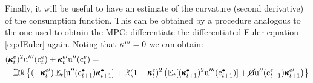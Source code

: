 \documentclass{handout}
\begin{document}
Finally, it will be useful to have an estimate of the curvature (second derivative) of the consumption function.  This can be obtained by a procedure analogous to the one used to obtain the MPC: differentiate the differentiated Euler equation \eqref{eq:dEuler} again.  Noting that $\kappa^{u\prime}=0$ we can obtain:
\begin{eqnarray}
\lefteqn{  (\MPCFunc^{e}_{t})^{2} \uPPP(\cFunc^{e}_{t}) +\MPCFunc_{t}^{e\prime}\uPP(\cFunc^{e}_{t}) = } &  & \nonumber \\ 
& & \beth \Rnorm \left\{(-\MPCFunc_{t}^{e\prime}) \Ex_{t}[\uPP(\cFunc^{\bullet}_{t+1})\MPCFunc^{\bullet}_{t+1}]
+  \Rnorm (1-\MPCFunc^{e}_{t})^{2}\left(\Ex_{t}[(\MPCFunc_{t+1}^{\bullet})^{2}\uPPP(\cFunc^{\bullet}_{t+1})]+\erate  \uPP(\cFunc^{e}_{t+1})\MPCFunc_{t+1}^{e\prime}\right)\right\} \nonumber \\ \label{eq:kappaPExpr}
\end{eqnarray}
\begin{comment} %
the limit of which as $\cRatE_{t} \rightarrow \infty$ is 
\begin{eqnarray}
\lefteqn{  (\MPCE)^{2} \uPPP(\cRatE_{t}) +\MPC^{e\prime}\uPP(\cRatE_{t}) = } &  & \nonumber \\ 
& & \beth \Rnorm (-\MPC^{e\prime}) \Ex_{t}[\uPP(\cFunc^{\bullet}_{t+1})\MPC^{\bullet}_{t+1}]
 + \beth \Rnorm^{2} (1-\MPCE)^{2} (\Ex_{t}[(\MPC_{t+1}^{\bullet})^{2}\uPPP(\cFunc^{\bullet}_{t+1})]+\erate \uPP(\cRatE_{t+1})\MPC^{e\prime}) \nonumber
\end{eqnarray}
but since as $\cRatE_{t} \rightarrow \infty$ the ratio of $\cRatE/\cTarg^{u}$ approaches 1 this approaches
\begin{eqnarray}
\lefteqn{  (\MPCE)^{2} \uPPP({c}_{t}) +\MPC^{e\prime}_{t}\uPP(c_{t}) = } &  & \nonumber \\ 
& & \beth \Rnorm (-\MPC^{e\prime}_{t}) \uPP(c_{t+1})\MPC
 + \beth \Rnorm^{2} (1-\MPCE)^{2} (\MPCE)^{2}\uPPP(c_{t+1})+\erate \uPP({c}_{t+1})\MPC^{e\prime}_{t+1}) \nonumber
\end{eqnarray}
but since $c_{t+1}$ approaches $\mu c_{t}$ this can be rewritten
\begin{eqnarray}
\lefteqn{  (\MPCE)^{2} \uPPP({c}_{t}) +\MPC^{e\prime}_{t}\uPP(c_{t}) = } &  & \nonumber \\ 
& & \beth \Rnorm (-\MPC^{e\prime}_{t}) \uPP(c_{t}) \mu^{-\CRRA-1}\MPC
 + \beth \Rnorm^{2} (1-\MPCE)^{2} (\MPCE)^{2}\uPPP(c_{t})\mu^{-\CRRA-2}+\erate \uPP({c}_{t})\mu^{-\CRRA-2}\MPC^{e\prime}_{t+1}) \nonumber
\end{eqnarray}
and dividing both sides by $\uPP(c_{t})$ and realizing that $\uPPP(c)/\uPP(c) = (\CRRA+1)/c$ we have
\begin{eqnarray}
\lefteqn{  (\MPCE)^{2} (\CRRA+1)/c_{t} +\MPC^{e\prime}_{t}= } &  & \nonumber \\ 
& & \beth \Rnorm (-\MPC^{e\prime}_{t})  \mu^{-\CRRA-1}\MPC
 + \beth \Rnorm^{2} (1-\MPCE)^{2} (\MPCE)^{2}\mu^{-\CRRA-2}(\CRRA+1)/c_{t}+\erate \mu^{-\CRRA-2}\MPC^{e\prime}_{t+1}) \nonumber
\end{eqnarray}
\end{comment}
\end{document}
